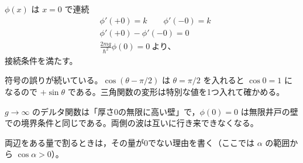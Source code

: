 $\phi(x)$ は $x=0$ で連続
\begin{align*}
&\phi'(+0)=k\qquad\phi'(-0)=k\\
&\phi'(+0)-\phi'(-0)=0\\
&\frac{2mg}{\hbar^{2}}\phi(0)=0\ \text{より、}
\end{align*}
接続条件を満たす。
\item {} 符号の誤りが続いている。$\cos(\theta-\pi/2)$ は $\theta=\pi/2$ を入れると $\cos0=1$ になるので $+\sin\theta$ である。三角関数の変形は特別な値を1つ入れて確かめる。
\item $g\to\infty$ のデルタ関数は「厚さ0の無限に高い壁」で，$\phi(0)=0$ は無限井戸の壁での境界条件と同じである。両側の波は互いに行き来できなくなる。
\item 両辺をある量で割るときは，その量が0でない理由を書く（ここでは $\alpha$ の範囲から $\cos\alpha>0$）。
